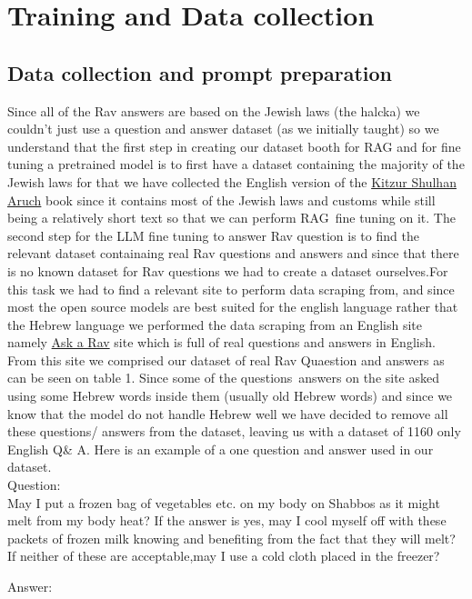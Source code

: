 \documentclass[11pt]{article}
\begin{document}
\section{Training and Data collection}
\subsection{Data collection and prompt preparation}
Since all of the Rav answers are based on the Jewish laws (the halcka) we couldn't just use a question and answer dataset (as we initially taught) so we understand that the first step in creating our dataset booth for RAG and for fine tuning a pretrained model is to  first have a dataset containing the majority of the Jewish laws for that we have collected the English version of the \href{https://en.wikipedia.org/wiki/Kitzur_Shulchan_Aruch}{ Kitzur Shulhan Aruch} book since it contains most of the Jewish laws and customs while still being a relatively short text so that we can perform RAG\ fine tuning on it.
The second step for the LLM fine tuning to answer Rav question is to find the relevant dataset containaing real Rav questions and answers  and since that there is no known dataset for Rav questions we had to create a dataset ourselves.For this task we had to find a relevant site to perform data scraping from, and since most the open source models are best suited for the english language rather that the Hebrew language we performed the data scraping from an English site namely \href{https://asktherav.com/ }{Ask a Rav} site which is full of real questions and answers in English. From this site we comprised our dataset of real Rav Quaestion and answers as can be seen on table 1.
Since some of the questions\ answers on the site asked using some Hebrew words inside them (usually old Hebrew words) and since we know that the model do not handle Hebrew well we have decided to remove all these questions/ answers from the dataset, leaving us with a dataset of 1160 only English Q\& A.
Here is an example of a one question and answer used in our dataset.\\
Question:\\
 May I put a frozen bag of vegetables etc. on my body on Shabbos as it might melt from my body heat?
If the answer is yes, may I cool myself off with these packets of frozen milk knowing and benefiting from the fact that they will melt? If neither of these are acceptable,may I use a cold cloth placed in the freezer?

Answer:\\
\end{document}
